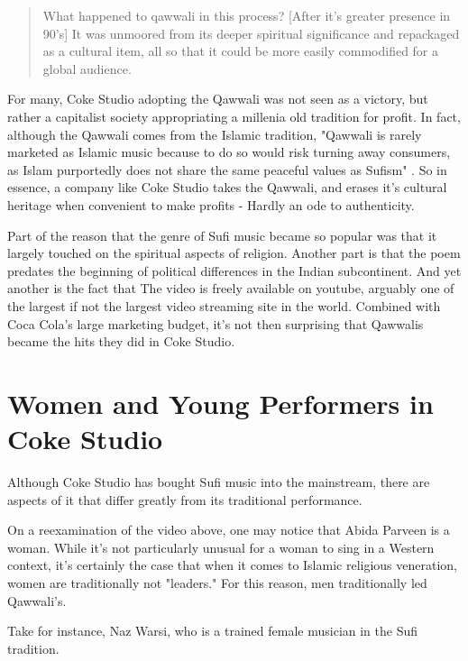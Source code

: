 \documentclass{article}
\begin{document}
  \begin{quote}
    What happened to qawwali in this process? [After it's greater presence in
    90's] It was unmoored from its deeper spiritual significance and repackaged
    as a cultural item, all so that it could be more easily commodified for a
    global audience. \autocite{sellingsufism}
  \end{quote}

  For many, Coke Studio adopting the Qawwali was not seen as a victory, but
  rather a capitalist society appropriating a millenia old tradition for profit.
  In fact, although the Qawwali comes from the Islamic tradition, "Qawwali is
  rarely marketed as Islamic music because to do so would risk turning away
  consumers, as Islam purportedly does not share the same peaceful values as
  Sufism" \autocite{sellingsufism}. So in essence, a company like Coke Studio 
  takes the Qawwali, and erases it's cultural heritage when convenient to make 
  profits - Hardly an ode to authenticity. 

  Part of the reason that the genre of Sufi music became so popular was that it
  largely touched on the spiritual aspects of religion. Another part is that the
  poem predates the beginning of political differences in the Indian
  subcontinent. And yet another is the fact that The video is freely available
  on youtube, arguably one of the largest if not the largest video streaming
  site in the world. Combined with Coca Cola's large marketing budget, it's not then 
  surprising that Qawwalis became the hits they did in Coke Studio. 

  \section{Women and Young Performers in Coke Studio}

  Although Coke Studio has bought Sufi music into the mainstream, there are aspects
  of it that differ greatly from its traditional performance. 

  On a reexamination of the video above, one may notice that Abida Parveen is a woman. 
  While it's not particularly unusual for a woman to sing in a Western context, it's 
  certainly the case that when it comes to Islamic religious veneration, women are 
  traditionally not "leaders." For this reason, men traditionally led Qawwali's.

  Take for instance, Naz Warsi, who is a trained female musician in the Sufi tradition. 
\end{document}

